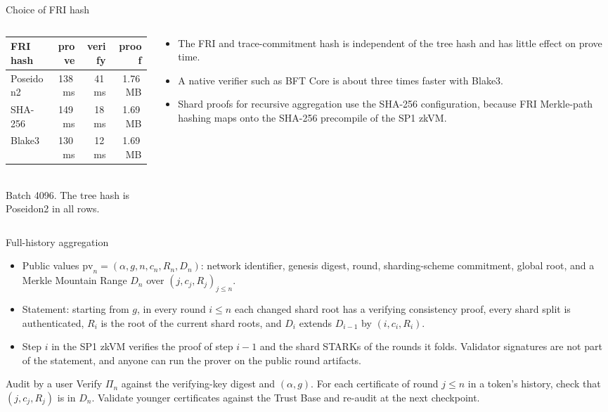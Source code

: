 \documentclass[aspectratio=169,10pt]{beamer}
\begin{document}
\begin{frame}{Choice of FRI hash}
\begin{columns}[T]
\begin{column}{0.45\textwidth}
\centering\small
\begin{tabular}{@{}lrrr@{}}
\toprule
FRI hash & prove & verify & proof \\
\midrule
Poseidon2 & 138\,ms & 41\,ms & 1.76\,MB \\
SHA-256 & 149\,ms & 18\,ms & 1.69\,MB \\
Blake3 & 130\,ms & 12\,ms & 1.69\,MB \\
\bottomrule
\end{tabular}\\[1mm]
\scriptsize Batch 4096. The tree hash is Poseidon2 in all rows.
\end{column}
\begin{column}{0.52\textwidth}
\small
\begin{itemize}
  \item The FRI and trace-commitment hash is independent of the tree hash and has little effect on prove time.
  \item A native verifier such as BFT Core is about three times faster with Blake3.
  \item Shard proofs for recursive aggregation use the SHA-256 configuration, because FRI Merkle-path hashing maps onto the SHA-256 precompile of the SP1 zkVM.
\end{itemize}
\end{column}
\end{columns}
\end{frame}

\begin{frame}{Full-history aggregation}
\small
\begin{itemize}
  \item Public values $\mathrm{pv}_n = (\alpha, g, n, c_n, R_n, D_n)$: network identifier, genesis digest, round, sharding-scheme commitment, global root, and a Merkle Mountain Range $D_n$ over $(j, c_j, R_j)_{j \le n}$.
  \item Statement: starting from $g$, in every round $i \le n$ each changed shard root has a verifying consistency proof, every shard split is authenticated, $R_i$ is the root of the current shard roots, and $D_i$ extends $D_{i-1}$ by $(i, c_i, R_i)$.
  \item Step $i$ in the SP1 zkVM verifies the proof of step $i-1$ and the shard STARKs of the rounds it folds. Validator signatures are not part of the statement, and anyone can run the prover on the public round artifacts.
\end{itemize}
\begin{block}{Audit by a user}
\footnotesize
Verify $\Pi_n$ against the verifying-key digest and $(\alpha, g)$. For each certificate of round $j \le n$ in a token's history, check that $(j, c_j, R_j)$ is in $D_n$. Validate younger certificates against the Trust Base and re-audit at the next checkpoint.
\end{block}
\end{frame}
\end{document}
